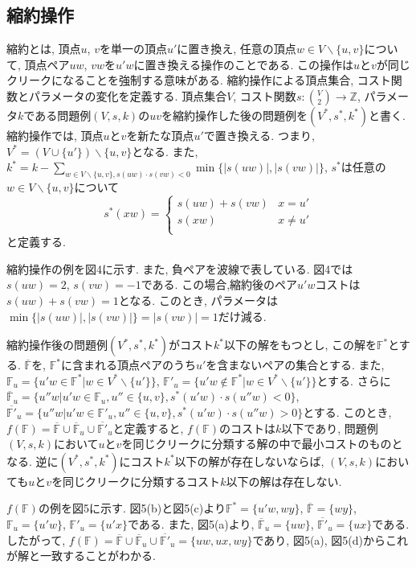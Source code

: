 \documentclass[10.5,a4paper,titlepage, dvipdfmx]{bxjsarticle}
\begin{document}
\subsection{縮約操作}
$\textbf{縮約}$とは, 頂点$u$, $v$を単一の頂点$u'$に置き換え, 任意の頂点$w \in V \backslash \{u,v\}$について, 頂点ペア$uw$, $vw$を$u'w$に置き換える操作のことである.
この操作は$u$と$v$が同じクリークになることを強制する意味がある.
縮約操作による頂点集合, コスト関数とパラメータの変化を定義する.
頂点集合$V$, コスト関数$s:\binom{V}{2} \rightarrow \mathbb{Z}$, パラメータ$k$である問題例$(V,s,k)$の$uv$を縮約操作した後の問題例を$(V^*,s^*,k^*)$と書く.
縮約操作では, 頂点$u$と$v$を新たな頂点$u'$で置き換える.
つまり, $V^*=(V \cup \{u'\}) \backslash \{u,v\}$となる.
また, $k^*= k - \sum_{w \in V \backslash \{u,v\},s(uw)\cdot s(vw) < 0} \min\{|s(uw)|, |s(vw)|\}$, $s^*$は任意の$w \in V \backslash \{u,v\}$について
\[s^*(xw)=
\left\{
    \begin{array}{ll}
        s(uw)+s(vw) & {x=u'}\\
        s(xw) & {x \neq u'}\\
    \end{array}
    \right.
\]
と定義する.\par
縮約操作の例を図4に示す.
また, 負ペアを波線で表している.
図4では$s(uw)=2$, $s(vw)=-1$である.
この場合,縮約後のペア$u'w$コストは$s(uw)+s(vw)=1$となる.
このとき, パラメータは$\min\{|s(uw)|, |s(vw)|\}=|s(vw)|=1$だけ減る.\par
縮約操作後の問題例$(V^*,s^*,k^*)$がコスト$k^*$以下の解をもつとし, この解を$\mathbb{F^*}$とする.
$\overline{\mathbb{F}}$を, $\mathbb{F^*}$に含まれる頂点ペアのうち$u'$を含まないペアの集合とする.
また, $\mathbb{F}_u=\{u'w \in \mathbb{F^*} | w \in V^* \backslash \{u'\}\}$, $\mathbb{F'}_u= \{u'w \notin \mathbb{F^*} | w \in V^* \backslash \{u'\}\}$とする.
さらに$\overline{\mathbb{F}}_u = \{u''w | u'w \in \mathbb{F}_u, u'' \in \{u,v\}, s^*(u'w) \cdot s(u''w) < 0\}$, $\overline{\mathbb{F'}}_u = \{u''w | u'w \in \mathbb{F'}_u, u'' \in \{u,v\}, s^*(u'w) \cdot s(u''w) > 0\}$とする.
このとき, $f(\mathbb{F})= \overline{\mathbb{F}} \cup \overline{\mathbb{F}}_u \cup \overline{\mathbb{F'}}_u$と定義すると, $f(\mathbb{F})$のコストは$k$以下であり, 問題例$(V,s,k)$において$u$と$v$を同じクリークに分類する解の中で最小コストのものとなる.
逆に$(V^*,s^*,k^*)$にコスト$k^*$以下の解が存在しないならば, $(V,s,k)$においても$u$と$v$を同じクリークに分類するコスト$k$以下の解は存在しない.\par
$f(\mathbb{F})$の例を図5に示す.
図5(b)と図5(c)より$\mathbb{F^*}=\{u'w, wy\}$, $\overline{\mathbb{F}}=\{wy\}$, $\mathbb{F}_u=\{u'w\}$, $\mathbb{F'}_u=\{u'x\}$である.
また, 図5(a)より, $\overline{\mathbb{F}}_u=\{uw\}$, $\overline{\mathbb{F'}}_u=\{ux\}$である.
したがって, $f(\mathbb{F})= \overline{\mathbb{F}} \cup \overline{\mathbb{F}}_u \cup \overline{\mathbb{F'}}_u=\{uw, ux, wy\}$であり, 図5(a), 図5(d)からこれが解と一致することがわかる.
\end{document}
